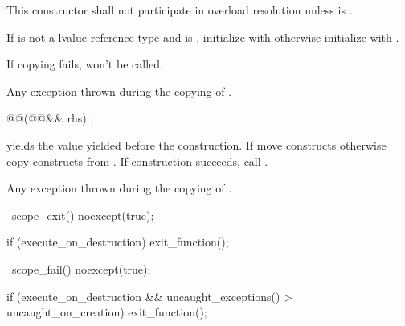 \documentclass[ebook,11pt,article]{memoir}
\begin{document}
\begin{itemdescr}
\pnum
\remarks This constructor shall not participate in overload resolution unless  is .

\pnum
\effects If  is not a lvalue-reference type and  is , initialize   with  otherwise initialize  with . \\
\begin{note}
If copying fails,  won't be called.
\end{note}

\pnum
\throws Any exception thrown during the copying of .
\end{itemdescr}

\begin{itemdecl}
@@(@@&& rhs) ;
\end{itemdecl}

\begin{itemdescr}
\pnum
\effects %
 yields the value  yielded before the construction.
If  move constructs otherwise copy constructs  from . If construction succeeds, call .

\pnum
\throws Any exception thrown during the copying of .
\end{itemdescr}

\begin{itemdecl}
~scope_exit() noexcept(true);
\end{itemdecl}

\begin{itemdescr}
\pnum
\effects 
\begin{codeblock}
if (execute_on_destruction)
	exit_function();
\end{codeblock}
\end{itemdescr}

\begin{itemdecl}
~scope_fail() noexcept(true);
\end{itemdecl}

\begin{itemdescr}
\pnum
\effects 
\begin{codeblock}
if (execute_on_destruction
   && uncaught_exceptions() > uncaught_on_creation)
	exit_function();
\end{codeblock}
\end{itemdescr}
\end{document}
